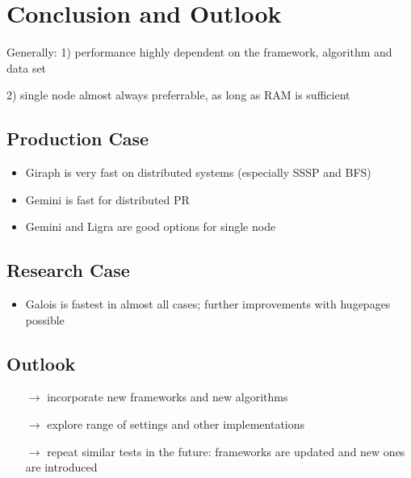 \documentclass{meetings}
\begin{document}
\restoregeometry



\section{Conclusion and Outlook}
Generally: 1) performance highly dependent on the framework, algorithm and data set

2) single node almost always preferrable, as long as RAM is sufficient
\begin{multicols}{2}
	\subsection{Production Case}
	\begin{itemize}
		\item Giraph is very fast on distributed systems (especially SSSP and BFS)
		\item Gemini is fast for distributed PR
		\item Gemini and Ligra are good options for single node
	\end{itemize}

	\columnbreak
	\subsection{Research Case}
	\begin{itemize}
		\item Galois is fastest in almost all cases; further improvements with hugepages possible
	\end{itemize}
\end{multicols}


\subsection{Outlook}
\begin{itemize}
	\item[$\rightarrow$] incorporate new frameworks and new algorithms
	\item[$\rightarrow$] explore range of settings and other implementations
	\item[$\rightarrow$] repeat similar tests in the future: frameworks are updated and new ones are introduced
\end{itemize}
\end{document}
